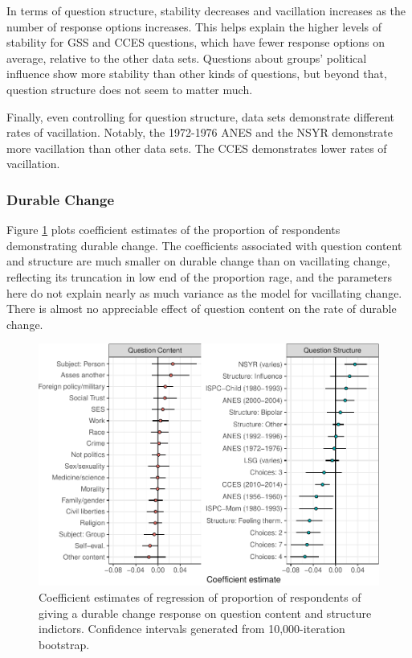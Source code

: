 \documentclass[12pt,]{article}
\begin{document}
In terms of question structure, stability decreases and vacillation increases as the number of response options increases. This helps explain the higher levels of stability for GSS and CCES questions, which have fewer response options on average, relative to the other data sets. Questions about groups' political influence show more stability than other kinds of questions, but beyond that, question structure does not seem to matter much.

Finally, even controlling for question structure, data sets demonstrate different rates of vacillation. Notably, the 1972-1976 ANES and the NSYR demonstrate more vacillation than other data sets. The CCES demonstrates lower rates of vacillation.

\hypertarget{durable-change}{%
\subsubsection{Durable Change}\label{durable-change}}

Figure \ref{fig:durableboot} plots coefficient estimates of the proportion of respondents demonstrating durable change. The coefficients associated with question content and structure are much smaller on durable change than on vacillating change, reflecting its truncation in low end of the proportion rage, and the parameters here do not explain nearly as much variance as the model for vacillating change. There is almost no appreciable effect of question content on the rate of durable change.

\begin{figure}
\centering
\includegraphics{ambivalence_everywhere_files/figure-latex/durableboot-1.pdf}
\caption{\label{fig:durableboot}Coefficient estimates of regression of proportion of respondents of giving a durable change response on question content and structure indictors. Confidence intervals generated from 10,000-iteration bootstrap.}
\end{figure}
\end{document}
